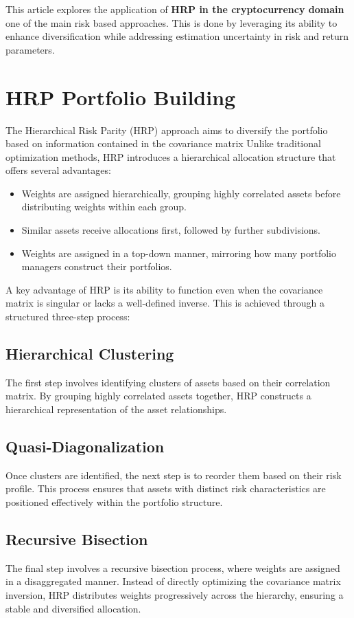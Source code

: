 \documentclass[english]{maciarticle}
\begin{document}
This article explores the application of \textbf{HRP in the cryptocurrency domain} one of the main risk based approaches. This is done by leveraging its ability to enhance diversification while addressing estimation uncertainty in risk and return parameters.

\section{HRP Portfolio Building}
The Hierarchical Risk Parity (HRP) approach aims to diversify the portfolio based on information contained in the covariance matrix Unlike traditional optimization methods, HRP introduces a hierarchical allocation structure that offers several advantages:

\begin{itemize}
    \item Weights are assigned hierarchically, grouping highly correlated assets before distributing weights within each group.
    \item Similar assets receive allocations first, followed by further subdivisions.
    \item Weights are assigned in a top-down manner, mirroring how many portfolio managers construct their portfolios.
\end{itemize}

A key advantage of HRP is its ability to function even when the covariance matrix is singular or lacks a well-defined inverse. This is achieved through a structured three-step process:

\subsection{Hierarchical Clustering}
The first step involves identifying clusters of assets based on their correlation matrix. By grouping highly correlated assets together, HRP constructs a hierarchical representation of the asset relationships.

\subsection{Quasi-Diagonalization}
Once clusters are identified, the next step is to reorder them based on their risk profile. This process ensures that assets with distinct risk characteristics are positioned effectively within the portfolio structure.

\subsection{Recursive Bisection}
The final step involves a recursive bisection process, where weights are assigned in a disaggregated manner. Instead of directly optimizing the covariance matrix inversion, HRP distributes weights progressively across the hierarchy, ensuring a stable and diversified allocation.
\end{document}
